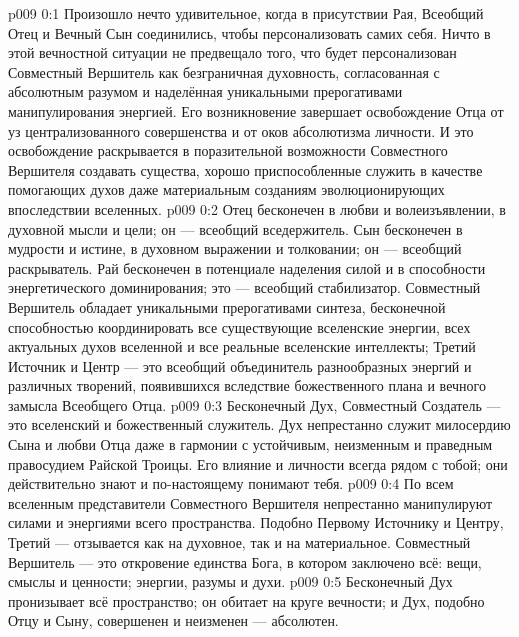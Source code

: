 \author{Божественный Советник}
\vs p009 0:1 Произошло нечто удивительное, когда в присутствии Рая, Всеобщий Отец и Вечный Сын соединились, чтобы персонализовать самих себя. Ничто в этой вечностной ситуации не предвещало того, что будет персонализован Совместный Вершитель как безграничная духовность, согласованная с абсолютным разумом и наделённая уникальными прерогативами манипулирования энергией. Его возникновение завершает освобождение Отца от уз централизованного совершенства и от оков абсолютизма личности. И это освобождение раскрывается в поразительной возможности Совместного Вершителя создавать существа, хорошо приспособленные служить в качестве помогающих духов даже материальным созданиям эволюционирующих впоследствии вселенных.
\vs p009 0:2 \pc Отец бесконечен в любви и волеизъявлении, в духовной мысли и цели; он --- всеобщий вседержитель. Сын бесконечен в мудрости и истине, в духовном выражении и толковании; он --- всеобщий раскрыватель. Рай бесконечен в потенциале наделения силой и в способности энергетического доминирования; это --- всеобщий стабилизатор. Совместный Вершитель обладает уникальными прерогативами синтеза, бесконечной способностью координировать все существующие вселенские энергии, всех актуальных духов вселенной и все реальные вселенские интеллекты; Третий Источник и Центр --- это всеобщий объединитель разнообразных энергий и различных творений, появившихся вследствие божественного плана и вечного замысла Всеобщего Отца.
\vs p009 0:3 Бесконечный Дух, Совместный Создатель --- это вселенский и божественный служитель. Дух непрестанно служит милосердию Сына и любви Отца даже в гармонии с устойчивым, неизменным и праведным правосудием Райской Троицы. Его влияние и личности всегда рядом с тобой; они действительно знают и по\hyp{}настоящему понимают тебя.
\vs p009 0:4 По всем вселенным представители Совместного Вершителя непрестанно манипулируют силами и энергиями всего пространства. Подобно Первому Источнику и Центру, Третий --- отзывается как на духовное, так и на материальное. Совместный Вершитель --- это откровение единства Бога, в котором заключено всё: вещи, смыслы и ценности; энергии, разумы и духи.
\vs p009 0:5 \pc Бесконечный Дух пронизывает всё пространство; он обитает на круге вечности; и Дух, подобно Отцу и Сыну, совершенен и неизменен --- абсолютен.
